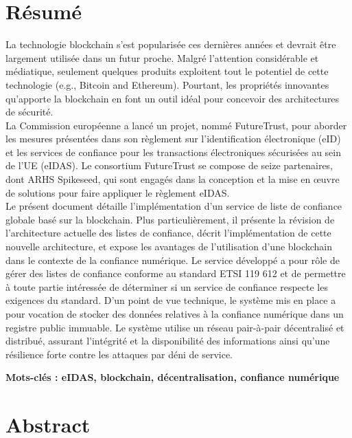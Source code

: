 \documentclass{tnreport}
\begin{document}
\cleardoublepage
\thispagestyle{empty}

\section*{Résumé}

La technologie blockchain s'est popularisée ces dernières années et devrait être largement utilisée dans un futur proche. Malgré l'attention considérable et médiatique, seulement quelques produits exploitent tout le potentiel de cette technologie (e.g., Bitcoin and Ethereum). Pourtant, les propriétés innovantes qu'apporte la blockchain en font un outil idéal pour concevoir des architectures de sécurité.
\\
La Commission européenne a lancé un projet, nommé FutureTrust, pour aborder les mesures présentées dans
son règlement sur l'identification électronique (eID) et les services de confiance pour les transactions électroniques sécurisées au sein de l'UE (eIDAS). Le consortium FutureTrust se compose de seize partenaires, dont ARHS Spikeseed, qui sont engagés dans la conception et la mise en œuvre de solutions pour faire appliquer le règlement eIDAS.
\\
Le présent document détaille l'implémentation d'un service de liste de confiance globale basé sur la blockchain. Plus particulièrement, il présente la révision de l’architecture actuelle des listes de confiance, décrit l'implémentation de cette nouvelle architecture, et expose les avantages de l'utilisation d'une blockchain dans le contexte de la confiance numérique. Le service développé a pour rôle de gérer des listes de confiance conforme au standard ETSI 119 612 et de permettre à toute partie intéressée de déterminer si un service de confiance respecte les exigences du standard. D'un point de vue technique, le système mis en place a pour vocation de stocker des données relatives à la confiance numérique dans un registre public immuable. Le système utilise un réseau pair-à-pair décentralisé et distribué, assurant l'intégrité et la disponibilité des informations ainsi qu'une résilience forte contre les attaques par déni de service.

{\bf Mots-clés : eIDAS, blockchain, décentralisation, confiance numérique} 


\section*{Abstract}
\end{document}
